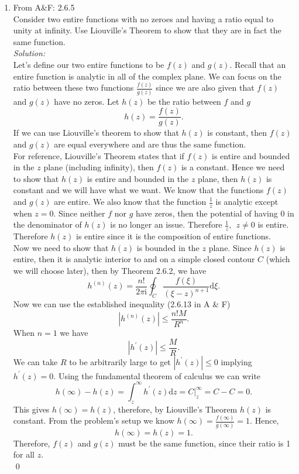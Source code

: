 \documentclass[10pt]{amsart}
\newcommand{\D}{\mathrm{d}}
\newcommand{\I}{\mathrm{i}}
\theoremstyle{nonumberplain}
\begin{document}
\begin{enumerate}[label={\bf {\arabic*}:}]
\item  From A\&F: 2.6.5\\
Consider two entire functions with no zeroes and having a ratio equal to unity at infinity.
Use Liouville's Theorem to show that they are in fact the same function. \\
\textit{Solution:} \\
Let's define our two entire functions to be $f(z)$ and $g(z)$.
Recall that an entire function is analytic in all of the complex plane.
We can focus on the ratio between these two functions $\frac {f(z)}{g(z)}$ since we are also given that $f(z)$ and $g(z)$ have no zeros.
Let $h(z)$ be the ratio between $f$ and $g$
$$ h(z) = \frac {f(z)}{g(z)}. $$
If we can use Liouville's theorem to show that $h(z)$ is constant, then $f(z)$ and $g(z)$ are equal everywhere and are thus the same function. \\

\noindent
For reference, Liouville's Theorem states that if $f(z)$ is entire and bounded in the $z$ plane (including infinity), then $f(z)$ is a constant.
Hence we need to show that $h(z)$ is entire and bounded in the $z$ plane, then $h(z)$ is constant and we will have what we want.
We know that the functions $f(z)$ and $g(z)$ are entire. We also know that the function $\frac 1 {z}$ is analytic except when $z = 0$.
Since neither $f$ nor $g$ have zeros, then the potential of having $0$ in the denominator of $h(z)$ is no longer an issue.
Therefore $\frac 1 z,\:\: z\neq 0$ is entire.
Therefore $h(z)$ is entire since it is the composition of entire functions. \\

\noindent
Now we need to show that $h(z)$ is bounded in the $z$ plane.
Since $h(z)$ is entire, then it is analytic interior to and on a simple closed contour $C$ (which we will choose later), then by Theorem 2.6.2, we have
$$
h^{(n)}(z) = \frac {n!}{2 \pi \I} \oint_C \frac {f(\xi)}{(\xi - z)^{n + 1}} \D \xi.
$$
Now we can use the established inequality (2.6.13 in A \& F)
$$
\left| h^{(n)}(z) \right| \leq \frac {n!M}{R^n}.
$$
When $n = 1$ we have
$$
\left| h^\prime(z) \right| \leq \frac {M}{R}.
$$
We can take $R$ to be arbitrarily large to get $\left| h^\prime(z) \right| \leq 0$ implying $h^\prime(z) = 0$.
Using the fundamental theorem of calculus we can write
$$
h(\infty) - h(z) = \int_z^{\infty} h^\prime(z) \D z = \left. C \right|_z^{\infty} = C - C = 0.
$$
This gives $h(\infty) = h(z)$, therefore, by Liouville's Theorem $h(z)$ is constant.
From the problem's setup we know $h(\infty) = \frac {f(\infty)}{g(\infty)} = 1$.
Hence,
$$h(\infty) = h(z) = 1.$$
Therefore, $f(z)$ and $g(z)$ must be the same function, since their ratio is 1 for all $z$.\\
\qed
\\


\end{enumerate}
\end{document}
